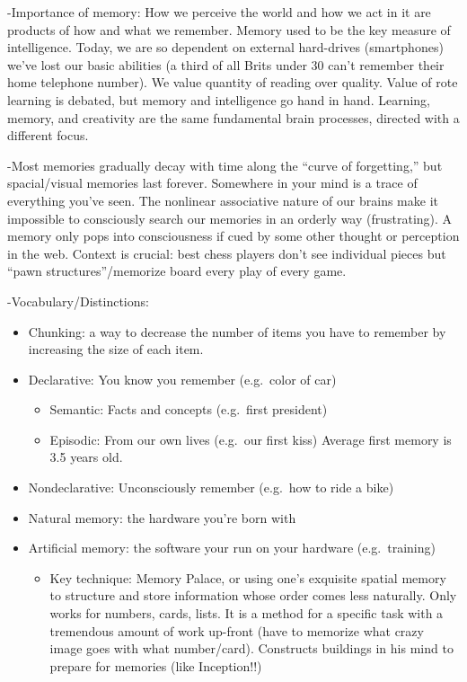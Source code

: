 \documentclass[
]{article}
\providecommand{\tightlist}{%
  \setlength{\itemsep}{0pt}\setlength{\parskip}{0pt}}
\begin{document}
-Importance of memory: How we perceive the world and how we act in it
are products of how and what we remember. Memory used to be the key
measure of intelligence. Today, we are so dependent on external
hard-drives (smartphones) we've lost our basic abilities (a third of all
Brits under 30 can't remember their home telephone number). We value
quantity of reading over quality. Value of rote learning is debated, but
memory and intelligence go hand in hand. Learning, memory, and
creativity are the same fundamental brain processes, directed with a
different focus.

-Most memories gradually decay with time along the ``curve of
forgetting,'' but spacial/visual memories last forever. Somewhere in
your mind is a trace of everything you've seen. The nonlinear
associative nature of our brains make it impossible to consciously
search our memories in an orderly way (frustrating). A memory only pops
into consciousness if cued by some other thought or perception in the
web. Context is crucial: best chess players don't see individual pieces
but ``pawn structures''/memorize board every play of every game.

-Vocabulary/Distinctions:

\begin{itemize}
\item
  Chunking: a way to decrease the number of items you have to remember
  by increasing the size of each item.
\item
  Declarative: You know you remember (e.g.~color of car)

  \begin{itemize}
  \item
    Semantic: Facts and concepts (e.g.~first president)
  \item
    Episodic: From our own lives (e.g.~our first kiss) Average first
    memory is 3.5 years old.
  \end{itemize}
\item
  Nondeclarative: Unconsciously remember (e.g.~how to ride a bike)
\item
  Natural memory: the hardware you're born with
\item
  Artificial memory: the software your run on your hardware
  (e.g.~training)

  \begin{itemize}
  \tightlist
  \item
    Key technique: Memory Palace, or using one's exquisite spatial
    memory to structure and store information whose order comes less
    naturally. Only works for numbers, cards, lists. It is a method for
    a specific task with a tremendous amount of work up-front (have to
    memorize what crazy image goes with what number/card). Constructs
    buildings in his mind to prepare for memories (like Inception!!)
  \end{itemize}
\end{itemize}
\end{document}
